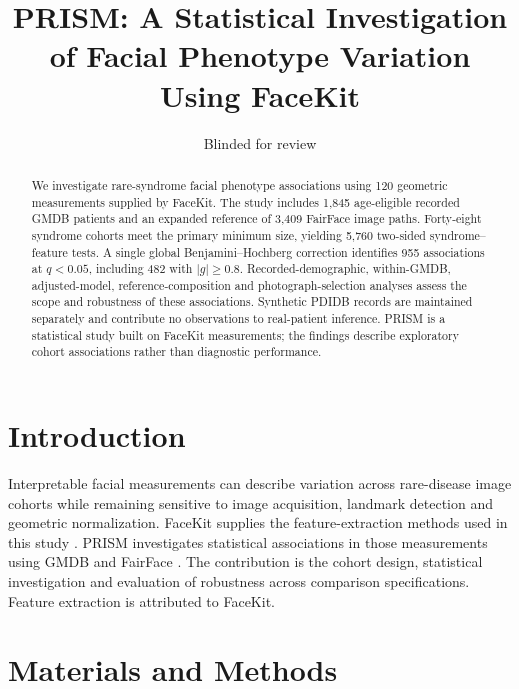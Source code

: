 \documentclass[11pt]{article}
\title{PRISM: A Statistical Investigation of Facial Phenotype Variation Using FaceKit}
\author{Blinded for review}
\date{}
\begin{document}
\maketitle
\begin{abstract}
We investigate rare-syndrome facial phenotype associations using 120 geometric measurements supplied by FaceKit. The study includes 1,845 age-eligible recorded GMDB patients and an expanded reference of 3,409 FairFace image paths. Forty-eight syndrome cohorts meet the primary minimum size, yielding 5,760 two-sided syndrome--feature tests. A single global Benjamini--Hochberg correction identifies 955 associations at $q<0.05$, including 482 with $|g|\geq0.8$. Recorded-demographic, within-GMDB, adjusted-model, reference-composition and photograph-selection analyses assess the scope and robustness of these associations. Synthetic PDIDB records are maintained separately and contribute no observations to real-patient inference. PRISM is a statistical study built on FaceKit measurements; the findings describe exploratory cohort associations rather than diagnostic performance.
\end{abstract}
\section{Introduction}
Interpretable facial measurements can describe variation across rare-disease image cohorts while remaining sensitive to image acquisition, landmark detection and geometric normalization. FaceKit supplies the feature-extraction methods used in this study \cite{facekit2026}. PRISM investigates statistical associations in those measurements using GMDB \cite{gestaltmatcher} and FairFace \cite{fairface}. The contribution is the cohort design, statistical investigation and evaluation of robustness across comparison specifications. Feature extraction is attributed to FaceKit.
\section{Materials and Methods}
\end{document}
